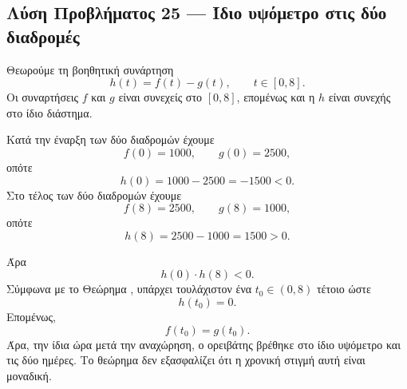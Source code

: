 \subsection*{Λύση Προβλήματος 25 --- Ίδιο υψόμετρο στις δύο διαδρομές}

Θεωρούμε τη βοηθητική συνάρτηση
\[
  h(t)=f(t)-g(t),
  \qquad t\in[0,8].
\]
Οι συναρτήσεις $f$ και $g$ είναι συνεχείς στο $[0,8]$, επομένως και η
$h$ είναι συνεχής στο ίδιο διάστημα.

Κατά την έναρξη των δύο διαδρομών έχουμε
\[
  f(0)=1000,
  \qquad
  g(0)=2500,
\]
οπότε
\[
  h(0)=1000-2500=-1500<0.
\]
Στο τέλος των δύο διαδρομών έχουμε
\[
  f(8)=2500,
  \qquad
  g(8)=1000,
\]
οπότε
\[
  h(8)=2500-1000=1500>0.
\]

Άρα
\[
  h(0)\cdot h(8)<0.
\]
Σύμφωνα με το Θεώρημα , υπάρχει τουλάχιστον ένα
$t_0\in(0,8)$ τέτοιο ώστε
\[
  h(t_0)=0.
\]
Επομένως,
\[
  {f(t_0)=g(t_0)}.
\]
Άρα, την ίδια ώρα μετά την αναχώρηση, ο ορειβάτης βρέθηκε στο ίδιο
υψόμετρο και τις δύο ημέρες. Το θεώρημα δεν εξασφαλίζει ότι η χρονική
στιγμή αυτή είναι μοναδική.
